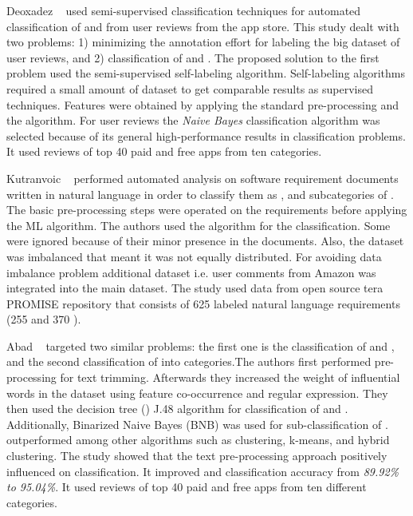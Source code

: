 Deoxadez \etal~\cite{Deocadez:2017} used semi-supervised classification
techniques for automated classification of \FR and \NFR from user reviews from
the app store. This study dealt with two problems: 1) minimizing the annotation
effort for labeling the big dataset of user reviews, and 2) classification of
\FR and \NFR. The proposed solution to the first problem used the
semi-supervised self-labeling algorithm. Self-labeling algorithms required a
small amount of dataset to get comparable results as supervised techniques.
Features were obtained by applying the standard pre-processing and the \BOW
algorithm. For user reviews the \emph{Naive Bayes} classification algorithm was
selected because of its general high-performance results in classification
problems. It used reviews of top 40 paid and free apps from ten
categories.

Kutranvoic \etal ~ \cite {Kurtanovic:2017} performed automated analysis on
software requirement documents written in natural language in order to classify
them as \FRs, \NFRs and subcategories of \NFRs. The basic pre-processing steps
were operated on the requirements before applying the ML algorithm. The authors
used the \SVM algorithm for the classification.
Some \NFR were ignored because of their minor presence in the documents. Also,
the dataset was imbalanced that meant it was not equally distributed. For avoiding data imbalance problem additional
dataset i.e. user comments from Amazon was integrated into
the main dataset.
The study used data from open source tera PROMISE repository that consists of
625 labeled natural language requirements (255 \FR [40.8\%] and 370
\NFR[59.2\%]).

Abad \etal~\cite{Abad:2017} targeted two similar problems: the first one is the
classification of \FR and \NFR, and the second classification of \NFR into
categories.The authors first performed pre-processing for text trimming.
Afterwards they increased the weight of influential words in the dataset using
feature co-occurrence and regular expression. They then used the decision tree
(\DT) J.48 algorithm for classification of \FRs and \NFR.
Additionally, Binarized Naive Bayes (BNB) was used for sub-classification of
\NFR. \BNB outperformed among other algorithms such as clustering, k-means, and
hybrid clustering. The study showed that the text pre-processing approach
positively influenced on classification. It improved \FR and \NFR
 classification accuracy from \textit{89.92\% to 95.04\%}. It used reviews of
 top 40 paid and free apps from ten
different categories.

